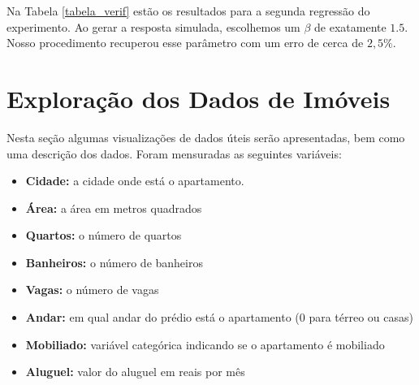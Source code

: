\begin{figure}[H]
    \centering
    
\end{figure}

Na Tabela \ref{tabela_verif} estão os resultados para a segunda regressão do experimento. Ao gerar a resposta simulada, escolhemos um $\beta$ de exatamente $1.5$. Nosso procedimento recuperou esse parâmetro com um erro de cerca de $2,5\%$.




\section{Exploração dos Dados de Imóveis}

Nesta seção algumas visualizações de dados úteis serão apresentadas, bem como uma descrição dos dados. Foram mensuradas as seguintes variáveis:

\begin{itemize}
    \item \textbf{Cidade:} a cidade onde está o apartamento.
    \item \textbf{Área:} a área em metros quadrados
    \item \textbf{Quartos:} o número de quartos
    \item \textbf{Banheiros:} o número de banheiros
    \item \textbf{Vagas:} o número de vagas
    \item \textbf{Andar:} em qual andar do prédio está o apartamento (0 para térreo ou casas)
    \item \textbf{Mobiliado:} variável categórica indicando se o apartamento é mobiliado
    \item \textbf{Aluguel:} valor do aluguel em reais por mês
\end{itemize}

